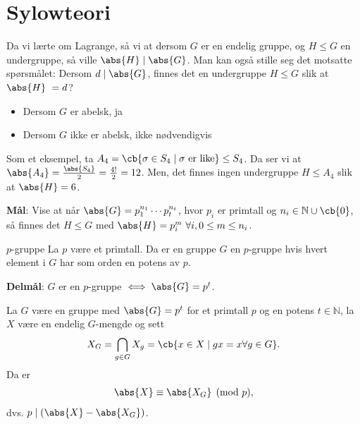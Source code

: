 \section{Sylowteori}
Da vi lærte om Lagrange, så vi at dersom $G$ er en endelig gruppe, og $H\leq G$ en undergruppe,
så ville $\abs{H}\mid \abs{G}$. Man kan også stille seg det motsatte spørsmålet: Dersom 
$d\mid \abs{G}$, finnes det en undergruppe $H\leq G$ slik at $\abs{H} = d$?
\begin{itemize}
  \item Dersom $G$ er abelsk, ja
  \item Dersom $G$ ikke er abelsk, ikke nødvendigvis
\end{itemize}
Som et eksempel, ta $A_4 = \cb{\sigma\in S_4\mid \sigma \text{ er like}}\leq S_4$. Da ser vi at
$\abs{A_4} = \frac{\abs{S_4}}{2} = \frac{4!}{2} = 12$. Men, det finnes ingen undergruppe 
$H\leq A_4$ slik at $\abs{H} = 6$. 

\textbf{Mål}: Vise at når $\abs{G} = p_1^{n_1}\cdots p_t^{n_t}$, hvor $p_i$ er primtall og
$n_i\in \mathbb{N}\cup \cb{0}$, så finnes det $H \leq G$ med 
$\abs{H} = p_i^{m}\ \forall i,0\leq m\leq n_i$. 

\begin{definition}{$p$-gruppe}{}
  La $p$ være et primtall. Da er en gruppe $G$ en $p$-gruppe hvis hvert element i $G$ har som
  orden en potens av $p$. 
\end{definition}

\textbf{Delmål}: $G$ er en $p$-gruppe $\iff \abs{G} = p^t$.

\begin{theorem*}{36.1}{}
  La $G$ være en gruppe med $\abs{G} = p^t$ for et primtall $p$ og en potens $t \in \mathbb{N}$, 
  la $X$ være en endelig $G$-mengde og sett 
  \begin{align}
    X_G = \bigcap_{g\in G}X_g = \cb{x\in X\mid gx=x\forall g\in G}.
  \end{align}
  Da er
  \begin{align}
    \abs{X} \equiv \abs{X_G} \pmod{p},
  \end{align}
  dvs. $p\mid (\abs{X}-\abs{X_G})$.
\end{theorem*}


